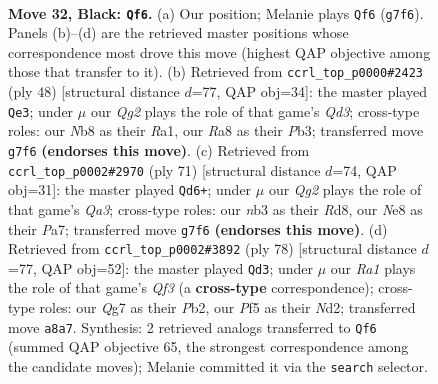 \documentclass[11pt]{article}
\begin{document}
\clearpage

\begin{figure}[p]\centering
\begin{subfigure}{0.46\textwidth}\centering
\resizebox{\linewidth}{!}{%
\newchessgame
\chessboard[
  setfen={rn2nk2/1p4qp/7p/p1PQ1p1P/P6P/1N6/7K/RN6 b - - 2 32},
  showmover=false,
  pgfstyle=straightmove, color=movearrow, markmove={g7-f6}
]}
\caption{}
\end{subfigure}\hfill
\begin{subfigure}{0.46\textwidth}\centering
\resizebox{\linewidth}{!}{%
\newchessgame
\chessboard[
  setfen={r1q3k1/5pp1/5n2/1N1p4/P4P1p/1P1Q3P/6P1/R5K1 w - - 0 25},
  showmover=false,
  pgfstyle=straightmove, color=movearrow, markmove={d3-e3}
]}
\caption{}
\end{subfigure}
\\[4pt]
\begin{subfigure}{0.46\textwidth}\centering
\resizebox{\linewidth}{!}{%
\newchessgame
\chessboard[
  setfen={3r3k/pp4pp/q4pn1/8/3NQ1P1/1PP4P/4RP1K/8 b - - 0 36},
  showmover=false,
  pgfstyle=straightmove, color=movearrow, markmove={a6-d6}
]}
\caption{}
\end{subfigure}\hfill
\begin{subfigure}{0.46\textwidth}\centering
\resizebox{\linewidth}{!}{%
\newchessgame
\chessboard[
  setfen={6k1/1p3pp1/3p1n1q/3P1P2/P2R4/5QPP/1P1N3K/2r5 w - - 3 40},
  showmover=false,
  pgfstyle=straightmove, color=movearrow, markmove={f3-d3}
]}
\caption{}
\end{subfigure}
\caption{\textbf{Move 32, Black: \texttt{Qf6}.} (a) Our position; Melanie plays \texttt{Qf6} (\texttt{g7f6}). Panels (b)--(d) are the retrieved master positions whose correspondence most drove this move (highest QAP objective among those that transfer to it). (b) Retrieved from \texttt{ccrl\_top\_p0000\#2423} (ply 48) [structural distance $d$=77, QAP obj=34]: the master played \texttt{Qe3}; under $\mu$ our \emph{Qg2} plays the role of that game's \emph{Qd3}; cross-type roles: our \emph{N}b8 as their \emph{R}a1, our \emph{R}a8 as their \emph{P}b3; transferred move \texttt{g7f6} \textbf{(endorses this move)}. (c) Retrieved from \texttt{ccrl\_top\_p0002\#2970} (ply 71) [structural distance $d$=74, QAP obj=31]: the master played \texttt{Qd6+}; under $\mu$ our \emph{Qg2} plays the role of that game's \emph{Qa3}; cross-type roles: our \emph{n}b3 as their \emph{R}d8, our \emph{N}e8 as their \emph{P}a7; transferred move \texttt{g7f6} \textbf{(endorses this move)}. (d) Retrieved from \texttt{ccrl\_top\_p0002\#3892} (ply 78) [structural distance $d$=77, QAP obj=52]: the master played \texttt{Qd3}; under $\mu$ our \emph{Ra1} plays the role of that game's \emph{Qf3} (a \textbf{cross-type} correspondence); cross-type roles: our \emph{Q}g7 as their \emph{P}b2, our \emph{P}f5 as their \emph{N}d2; transferred move \texttt{a8a7}. Synthesis: 2 retrieved analogs transferred to \texttt{Qf6} (summed QAP objective 65, the strongest correspondence among the candidate moves); Melanie committed it via the \texttt{search} selector.}
\label{fig:thought-m63}
\end{figure}
\end{document}

